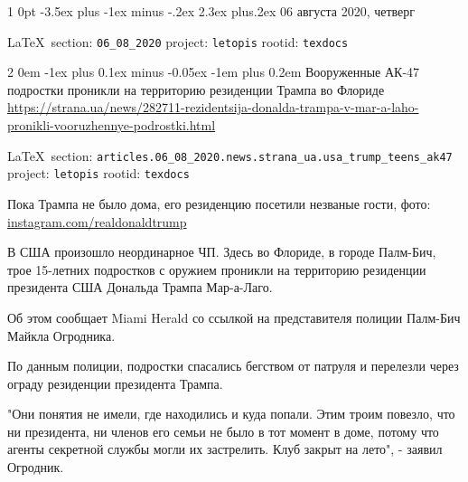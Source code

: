 \documentclass[a4paper,11pt]{extreport}
\makeatletter
\renewcommand\section{%
  \clearpage
  \@startsection{section}%
    {1}%
    {0pt}%
    {-3.5ex plus -1ex minus -.2ex}%
    {2.3ex plus.2ex}%
    {\centering\normalfont\Huge\bfseries}%
}
\renewcommand\subsection{%
  \clearpage
    \@startsection{subsection}%
    {2}%
    {0em}%
    {-1ex plus 0.1ex minus -0.05ex}%
    {-1em plus 0.2em}%
    {\scshape\bfseries\Large}%
}
\makeatother
\begin{document}
\section{06 августа 2020, четверг}
\label{sec:06_08_2020}
  
\vspace{0.5cm}
 {\ifDEBUG\small\LaTeX~section: \verb|06_08_2020| project: \verb|letopis| rootid: \verb|texdocs|	\fi}
\vspace{0.5cm}

 
 
\subsection{Вооруженные АК-47 подростки проникли на территорию резиденции Трампа во Флориде}
\label{sec:articles.06_08_2020.news.strana_ua.usa_trump_teens_ak47}
\url{https://strana.ua/news/282711-rezidentsija-donalda-trampa-v-mar-a-laho-pronikli-vooruzhennye-podrostki.html}
  
\vspace{0.5cm}
 {\ifDEBUG\small\LaTeX~section: \verb|articles.06_08_2020.news.strana_ua.usa_trump_teens_ak47| project: \verb|letopis| rootid: \verb|texdocs|	\fi}
\vspace{0.5cm}


Пока Трампа не было дома, его резиденцию посетили незваные гости, фото:
\url{instagram.com/realdonaldtrump} 

В США произошло неординарное ЧП. Здесь во Флориде, в городе Палм-Бич, трое
15-летних подростков с оружием проникли на территорию резиденции президента США
Дональда Трампа Мар-а-Лаго.

Об этом сообщает Miami Herald со ссылкой на представителя полиции Палм-Бич
Майкла Огродника.

По данным полиции, подростки спасались бегством от патруля и перелезли через
ограду резиденции президента Трампа.

"Они понятия не имели, где находились и куда попали. Этим троим повезло, что ни
президента, ни членов его семьи не было в тот момент в доме, потому что агенты
секретной службы могли их застрелить. Клуб закрыт на лето", - заявил Огродник.
 
\end{document}
